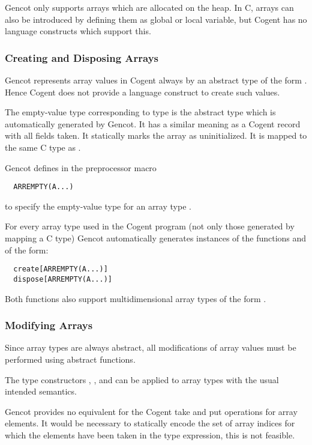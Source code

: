 Gencot only supports arrays which are allocated on the heap. In C, arrays can also be introduced by defining
them as global or local variable, but Cogent has no language constructs which support this.

\subsubsection{Creating and Disposing Arrays}

Gencot represents array values in Cogent always by an abstract type of the form .
Hence Cogent does not provide a language construct to create such values. 

The empty-value type corresponding to type  is the abstract type  which
is automatically generated by Gencot. It has a similar meaning as a Cogent
record with all fields taken. It statically marks the array as uninitialized. It is mapped to the same C 
type as .

Gencot defines in  the preprocessor macro 
\begin{verbatim}
  ARREMPTY(A...)
\end{verbatim}
to specify the empty-value type for an array type .

For every array type  used in the Cogent program (not only those generated by mapping a C type) Gencot automatically
generates instances of the functions  and  of the form:
\begin{verbatim}
  create[ARREMPTY(A...)]
  dispose[ARREMPTY(A...)]
\end{verbatim}

Both functions also support multidimensional array types of the form .

\subsubsection{Modifying Arrays}

Since array types are always abstract, all modifications of array values must be performed using abstract functions.

The type constructors , , and  can be applied to array types with the 
usual intended semantics. 

Gencot provides no equivalent for the Cogent take and put operations for array elements. It would be
necessary to statically encode the set of array indices for which the elements have been taken in the type expression,
this is not feasible.

